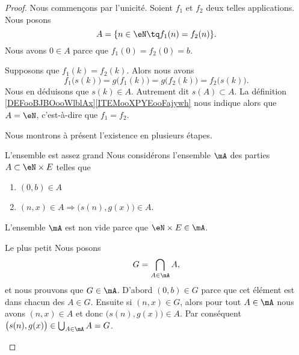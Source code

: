 \begin{proof}
    Nous commençons par l'unicité. Soient \( f_1\) et \( f_2\) deux telles applications. Nous posons
    \begin{equation}
        A=\{ n\in \eN\tq f_1(n)=f_2(n) \}.
    \end{equation}
    Nous avons \( 0\in A\) parce que \( f_1(0)=f_2(0)=b\).

    Supposons que \( f_1(k)=f_2(k)\). Alors nous avons
    \begin{equation}
        f_1\big( s(k) \big)=g\big( f_1(k) \big)=g\big( f_2(k) \big)=f_2\big( s(k) \big).
    \end{equation}
    Nous en déduisons que \( s(k)\in A\). Autrement dit \( s(A)\subset A\). La définition \ref{DEFooBJBOooWlblAx}\ref{ITEMooXPYEooFajywh} nous indique alors que \( A=\eN\), c'est-à-dire que \( f_1=f_2\).

    Nous montrons à présent l'existence en plusieurs étapes.
    \begin{subproof}
    \item[L'ensemble est assez grand]
    Nous considérons l'ensemble \( \mA\) des parties \( A\subset \eN\times E\) telles que
    \begin{enumerate}
        \item
            \( (0,b)\in A\)
        \item
            \( (n,x)\in A \Rightarrow \big( s(n),g(x) \big)\in A\).
    \end{enumerate}
    L'ensemble \( \mA\) est non vide parce que \( \eN\times E\in \mA\). 
\item[Le plus petit]
    Nous posons
    \begin{equation}
        G=\bigcap_{A\in \mA}A,
    \end{equation}
    et nous prouvons que \( G\in\mA\). D'abord \( (0,b)\in G\) parce que cet élément est dans chacun des \( A\in G\). Ensuite si \( (n,x)\in G\), alors pour tout \( A\in\mA \) nous avons \( (n,x)\in A\) et donc \( \big( s(n),g(x) \big)\in A\). Par conséquent \( \big( s(n),g(x) \big)\in \bigcup_{A\in\mA}A=G\).


\end{subproof}
\end{proof}
